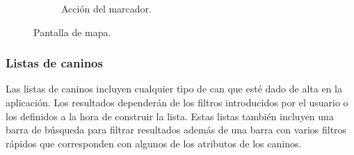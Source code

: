 \documentclass[a4paper, 12pt]{article}
\begin{document}
\begin{figure}[H]
\begin{subfigure}{0.48\textwidth}
\begin{center}
			\caption{Acción del marcador.}
		\end{center}  
	\end{subfigure}\hfill
	\caption{Pantalla de mapa.}
\end{figure}

\newpage
\subsubsection*{Listas de caninos}

Las listas de caninos incluyen cualquier tipo de can que esté dado de alta en la aplicación. Los resultados dependerán de los filtros introducidos por el usuario o los definidos a la hora de construir la lista. Estas listas también incluyen una barra de búsqueda para filtrar resultados además de una barra con varios filtros rápidos que corresponden con algunos de los atributos de los caninos.
\end{document}
